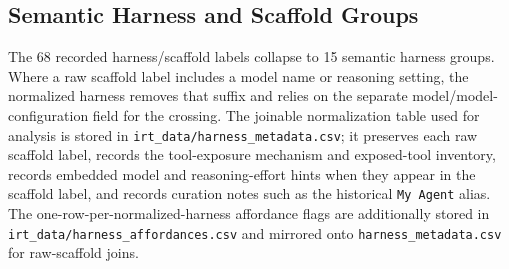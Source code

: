 \subsection{Semantic Harness and Scaffold Groups}

The 68 recorded harness/scaffold labels collapse to 15 semantic harness groups. Where a raw scaffold label includes a model name or reasoning setting, the normalized harness removes that suffix and relies on the separate model/model-configuration field for the crossing. The joinable normalization table used for analysis is stored in \texttt{irt\_data/harness\_metadata.csv}; it preserves each raw scaffold label, records the tool-exposure mechanism and exposed-tool inventory, records embedded model and reasoning-effort hints when they appear in the scaffold label, and records curation notes such as the historical \texttt{My Agent} alias. The one-row-per-normalized-harness affordance flags are additionally stored in \texttt{irt\_data/harness\_affordances.csv} and mirrored onto \texttt{harness\_metadata.csv} for raw-scaffold joins.

